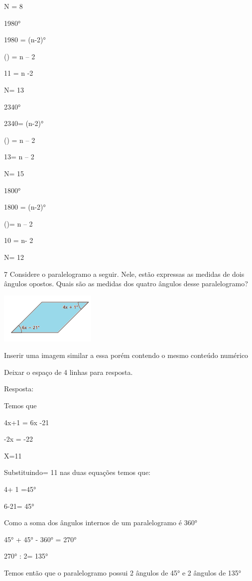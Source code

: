 N = 8

\item 1980°

1980 = (n-2)°

() = n -- 2

11 = n -2

N= 13

\item 2340°

2340= (n-2)°

() = n -- 2

13= n -- 2

N= 15

\item 1800°

1800 = (n-2)°

()= n -- 2

10 = n- 2

N= 12

\num{7} Considere o paralelogramo a seguir. Nele, estão expressas as medidas
de dois ângulos opostos. Quais são as medidas dos quatro ângulos desse
paralelogramo?

\includegraphics[width=1\times 82292in,height=0\times 95833in]{./imgSAEB_8_MAT/media/image9.png}

Inserir uma imagem similar a essa porém contendo o mesmo conteúdo
numérico

Deixar o espaço de 4 linhas para resposta.

Resposta:

Temos que

4x+1 = 6x -21

-2x = -22

X=11

Substituindo\times = 11 nas duas equações temos que:

4+ 1 =45°

6-21= 45°

Como a soma dos ângulos internos de um paralelogramo é 360°

45° + 45° - 360° = 270°

270° : 2= 135°

Temos então que o paralelogramo possui 2 ângulos de 45° e 2 ângulos de
135°

